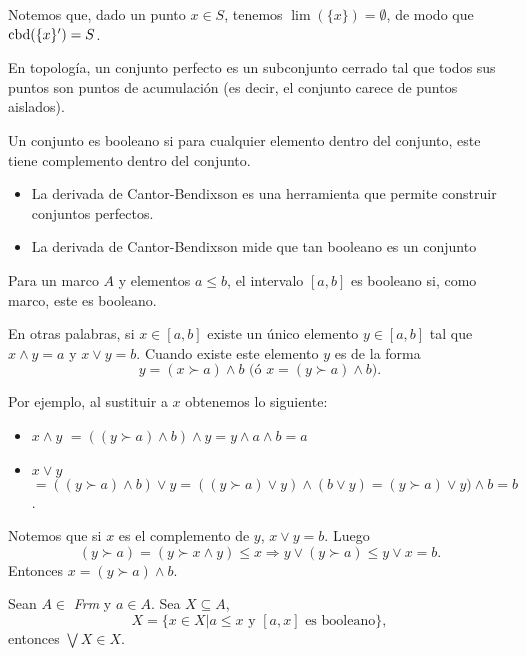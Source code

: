 Notemos que, dado un punto $x\in S$,
tenemos $\lim(\{x\})=\emptyset$,
de modo que $\operatorname{cbd}(\{x\}')=S$.

En topología, un conjunto perfecto es un subconjunto cerrado tal que todos sus puntos son puntos de acumulación (es decir, el conjunto carece de puntos aislados).

Un conjunto es booleano si para cualquier elemento dentro del conjunto, este tiene complemento dentro del conjunto.
\begin{itemize}
\item La derivada de Cantor-Bendixson es una herramienta que permite construir conjuntos perfectos.
\item La derivada de Cantor-Bendixson mide que tan booleano es un conjunto
\end{itemize}

\begin{definition}
Para un marco $A$ y elementos $a\leq b$, el intervalo $[a,b]$ es booleano si, como marco, este es booleano.
\end{definition}

\noindent
En otras palabras, si $x\in[a,b]$ existe un único elemento $y\in[a,b]$ tal que $x\wedge y=a$ y $x\vee y=b$. Cuando existe este elemento $y$ es de la forma $$y=(x\succ a)\wedge b\mbox{  (ó }x=(y\succ a)\wedge b).$$

\noindent
Por ejemplo, al sustituir a $x$ obtenemos lo siguiente:

\begin{itemize}
    \item $x\wedge y$ $=((y\succ a)\wedge b)\wedge y=y\wedge a\wedge b=a$
\item $x\vee y$ $=((y\succ a)\wedge b)\vee y=((y\succ a)\vee y)\wedge (b\vee y)=(y\succ a)\vee y)\wedge b=b$.
\end{itemize}

\noindent
Notemos que si $x$ es el complemento de $y$, $x\vee y=b$. Luego $$(y\succ a)=(y\succ x\wedge y)\leq x\Rightarrow y\vee (y\succ a)\leq y\vee x=b.$$
Entonces $x=(y\succ a)\wedge b.$

\begin{lemma}
Sean $A\in$ \textit{Frm} y $a\in A$. Sea $X\subseteq A$, $$X=\{x\in X|a\leq x\mbox{ y } [a, x]\mbox{ es booleano}\},$$ entonces $\bigvee X\in X$. 
\end{lemma}

